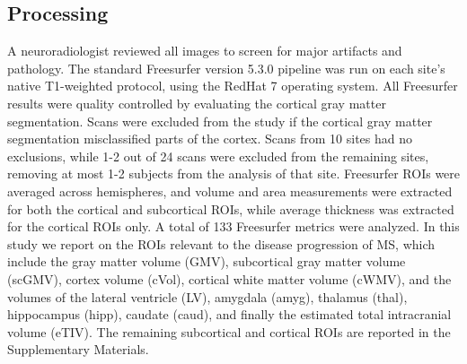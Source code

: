 \subsection{Processing}
 A neuroradiologist reviewed all images to screen for major artifacts and pathology. The standard Freesurfer \cite{freesurferPaper} version 5.3.0 pipeline was run on each site's native T1-weighted protocol, using the RedHat 7 operating system. All Freesurfer results were quality controlled by evaluating the cortical gray matter segmentation. Scans were excluded from the study if the cortical gray matter segmentation misclassified parts of the cortex. Scans from 10 sites had no exclusions, while 1-2 out of 24 scans were excluded from the remaining sites, removing at most 1-2 subjects from the analysis of that site. Freesurfer ROIs were averaged across hemispheres, and volume and area measurements were extracted for both the cortical and subcortical ROIs, while average thickness was extracted for the cortical ROIs only. A total of 133 Freesurfer metrics were analyzed. In this study we report on the ROIs relevant to the disease progression of MS, which include the gray matter volume (GMV), subcortical gray matter volume (scGMV), cortex volume (cVol), cortical white matter volume (cWMV), and the volumes of the lateral ventricle (LV), amygdala (amyg), thalamus (thal), hippocampus (hipp), caudate (caud), and finally the estimated total intracranial volume (eTIV). The remaining subcortical  and cortical ROIs are reported in the Supplementary Materials.